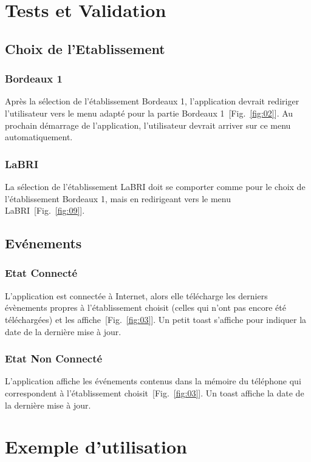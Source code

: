 \documentclass [pdftex,12pt] {report}
\begin{document}
\chapter{Tests et Validation}
  
  \section{Choix de l'Etablissement}
    \subsection{Bordeaux 1}
      Après la sélection de l'établissement Bordeaux 1, l'application devrait rediriger l'utilisateur vers le menu adapté pour la partie Bordeaux 1~[Fig.~\ref{fig:02}]. Au prochain démarrage de l'application, l'utilisateur devrait arriver sur ce menu automatiquement.

    \subsection{LaBRI}
      La sélection de l'établissement LaBRI doit se comporter comme pour le choix de l'établissement Bordeaux 1, mais en redirigeant vers le menu LaBRI~[Fig.~\ref{fig:09}].

  \section{Evénements}  
    \subsection{Etat Connecté}
      L'application est connectée à Internet, alors elle télécharge les derniers évènements propres à l'établissement choisit (celles qui n'ont pas encore été téléchargées) et les affiche~[Fig.~\ref{fig:03}]. Un petit toast s'affiche pour indiquer la date de la dernière mise à jour.

    \subsection{Etat Non Connecté}
      L'application affiche les événements contenus dans la mémoire du téléphone qui correspondent à l'établissement choisit~[Fig.~\ref{fig:03}]. Un toast affiche la date de la dernière mise à jour.
    

\chapter{Exemple d'utilisation}
\end{document}
